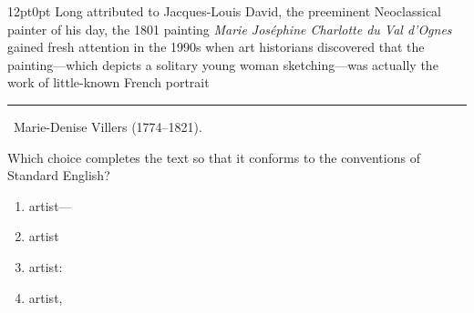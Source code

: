\documentclass[11pt, twocolumn]{article}
\newcounter{questionnum}
\begin{document}
\vspace{6pt}\noindent
\begin{minipage}{\columnwidth}\raggedright
\noindent{}\par\vspace{8pt}
\begin{adjustwidth}{12pt}{0pt}
Long attributed to Jacques-Louis David, the preeminent Neoclassical painter of his day, the 1801 painting \textit{Marie Joséphine Charlotte du Val d'Ognes} gained fresh attention in the 1990s when art historians discovered that the painting---which depicts a solitary young woman sketching---was actually the work of little-known French portrait \,\rule{2cm}{0.4pt}\, Marie-Denise Villers (1774--1821).
\vspace{6pt}

Which choice completes the text so that it conforms to the conventions of Standard English?
\begin{enumerate}[label=\Alph*),leftmargin=18pt,topsep=3pt,itemsep=2pt]
  \item artist---
  \item artist
  \item artist:
  \item artist,
\end{enumerate}
\end{adjustwidth}
\end{minipage}\par
\end{document}
